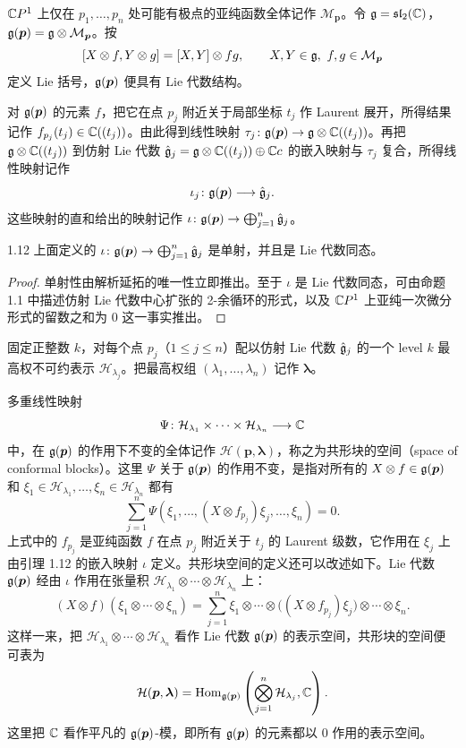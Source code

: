 $\mathbb{C}P^1$ 上仅在 $p_1,\dots,p_n$ 处可能有极点的亚纯函数全体记作 $\mathcal{M}_{\bm p}$。令 $\mathfrak{g}=\mathfrak{sl}_2(\mathbb{C})$，$\mathfrak{g}(\bm p)=\mathfrak{g}\otimes\mathcal{M}_{\bm p}$。按
\[
  [X\otimes f,Y\otimes g]=[X,Y]\otimes fg,\qquad X,Y\in\mathfrak{g},\ f,g\in\mathcal{M}_{\bm p}
\]
定义 Lie 括号，$\mathfrak{g}(\bm p)$ 便具有 Lie 代数结构。

对 $\mathfrak{g}(\bm p)$ 的元素 $f$，把它在点 $p_j$ 附近关于局部坐标 $t_j$ 作 Laurent 展开，所得结果记作 $f_{p_j}(t_j)\in\mathbb{C}((t_j))$。由此得到线性映射 $\tau_j\colon\mathfrak{g}(\bm p)\to\mathfrak{g}\otimes\mathbb{C}((t_j))$。再把 $\mathfrak{g}\otimes\mathbb{C}((t_j))$ 到仿射 Lie 代数 $\hat{\mathfrak{g}}_j=\mathfrak{g}\otimes\mathbb{C}((t_j))\oplus\mathbb{C} c$ 的嵌入映射与 $\tau_j$ 复合，所得线性映射记作
\[
  \iota_j\colon\mathfrak{g}(\bm p)\longrightarrow\hat{\mathfrak{g}}_j .
\]
这些映射的直和给出的映射记作 $\iota\colon\mathfrak{g}(\bm p)\to\bigoplus_{j=1}^{n}\hat{\mathfrak{g}}_j$。

\begin{lemma*}{1.12}
上面定义的 $\iota\colon\mathfrak{g}(\bm p)\to\bigoplus_{j=1}^{n}\hat{\mathfrak{g}}_j$ 是单射，并且是 Lie 代数同态。
\end{lemma*}

\begin{proof}
单射性由解析延拓的唯一性立即推出。至于 $\iota$ 是 Lie 代数同态，可由命题 1.1 中描述仿射 Lie 代数中心扩张的 2-余循环的形式，以及 $\mathbb{C}P^1$ 上亚纯一次微分形式的留数之和为 $0$ 这一事实推出。
\end{proof}


固定正整数 $k$，对每个点 $p_j$（$1\le j\le n$）配以仿射 Lie 代数 $\hat{\mathfrak{g}}_j$ 的一个 level $k$ 最高权不可约表示 $\mathcal{H}_{\lambda_j}$。把最高权组 $(\lambda_1,\dots,\lambda_n)$ 记作 $\bm\lambda$。

多重线性映射
\[
  \Psi\colon\mathcal{H}_{\lambda_1}\times\cdots\times\mathcal{H}_{\lambda_n}\longrightarrow\mathbb{C}
\]
中，在 $\mathfrak{g}(\bm p)$ 的作用下不变的全体记作 $\mathcal{H}(\bm p,\bm\lambda)$，称之为共形块的空间（space of conformal blocks）。这里 $\Psi$ 关于 $\mathfrak{g}(\bm p)$ 的作用不变，是指对所有的 $X\otimes f\in\mathfrak{g}(\bm p)$ 和 $\xi_1\in\mathcal{H}_{\lambda_1},\dots,\xi_n\in\mathcal{H}_{\lambda_n}$ 都有
\[
  \sum_{j=1}^{n}\Psi(\xi_1,\dots,(X\otimes f_{p_j})\xi_j,\dots,\xi_n)=0 .
\]
上式中的 $f_{p_j}$ 是亚纯函数 $f$ 在点 $p_j$ 附近关于 $t_j$ 的 Laurent 级数，它作用在 $\xi_j$ 上由引理 1.12 的嵌入映射 $\iota$ 定义。共形块空间的定义还可以改述如下。Lie 代数 $\mathfrak{g}(\bm p)$ 经由 $\iota$ 作用在张量积 $\mathcal{H}_{\lambda_1}\otimes\cdots\otimes\mathcal{H}_{\lambda_n}$ 上：
\[
  (X\otimes f)(\xi_1\otimes\cdots\otimes\xi_n)
  =\sum_{j=1}^{n}\xi_1\otimes\cdots\otimes\bigl((X\otimes f_{p_j})\xi_j\bigr)\otimes\cdots\otimes\xi_n .
\]
这样一来，把 $\mathcal{H}_{\lambda_1}\otimes\cdots\otimes\mathcal{H}_{\lambda_n}$ 看作 Lie 代数 $\mathfrak{g}(\bm p)$ 的表示空间，共形块的空间便可表为
\[
  \mathcal{H}(\bm p,\bm\lambda)
  =\operatorname{Hom}_{\mathfrak{g}(\bm p)}\left(\bigotimes_{j=1}^{n}\mathcal{H}_{\lambda_j},\mathbb{C}\right).
\]
这里把 $\mathbb{C}$ 看作平凡的 $\mathfrak{g}(\bm p)$-模，即所有 $\mathfrak{g}(\bm p)$ 的元素都以 $0$ 作用的表示空间。

